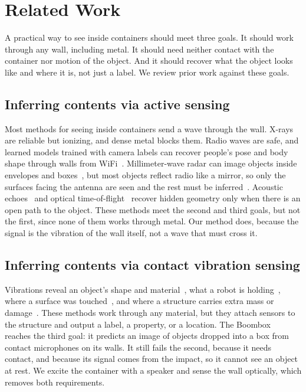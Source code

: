 \section{Related Work}
\label{sec:related}

A practical way to see inside containers should meet three goals.
It should work through any wall, including metal.
It should need neither contact with the container nor motion of the object.
And it should recover what the object looks like and where it is, not just a label.
We review prior work against these goals.

\subsection{Inferring contents via active sensing}
Most methods for seeing inside containers send a wave through the wall.
X-rays are reliable but ionizing, and dense metal blocks them.
Radio waves are safe, and learned models trained with camera labels can recover people's pose and body shape through walls from WiFi~\cite{adib2013see,zhao2018rfpose,wang2019personinwifi,geng2022densepose}.
Millimeter-wave radar can image objects inside envelopes and boxes~\cite{ganse2021envelopes,dodds2025mmnorm,lu2026geraf,dodds2025waveformer}, but most objects reflect radio like a mirror, so only the surfaces facing the antenna are seen and the rest must be inferred~\cite{dodds2025mmnorm,lu2026geraf,dodds2025waveformer}.
Acoustic echoes~\cite{lindell2019acoustic,christensen2020batvision} and optical time-of-flight~\cite{velten2012recovering} recover hidden geometry only when there is an open path to the object.
These methods meet the second and third goals, but not the first, since none of them works through metal.
Our method does, because the signal is the vibration of the wall itself, not a wave that must cross it.

\subsection{Inferring contents via contact vibration sensing}
Vibrations reveal an object's shape and material~\cite{zhang2017shape,gao2023objectfolder,clarke2023realimpact}, what a robot is holding~\cite{liu2024sonicsense}, where a surface was touched~\cite{zaielamri2026vibrosense,liu2017vibsense,iravantchi2023sawsense}, and where a structure carries extra mass or damage~\cite{dackermann2013identification,ostachowicz2002location,azuara2021damage}.
These methods work through any material, but they attach sensors to the structure and output a label, a property, or a location.
The Boombox~\cite{chen2021boombox} reaches the third goal: it predicts an image of objects dropped into a box from contact microphones on its walls.
It still fails the second, because it needs contact, and because its signal comes from the impact, so it cannot see an object at rest.
We excite the container with a speaker and sense the wall optically, which removes both requirements.

